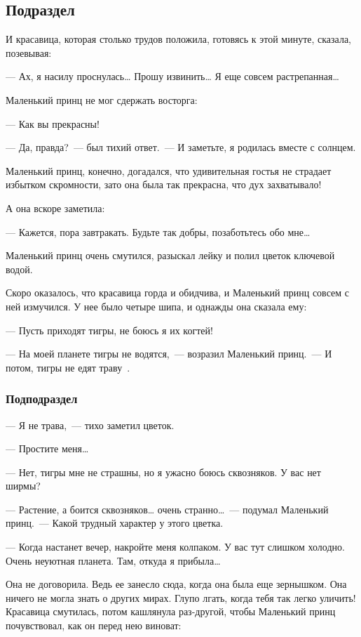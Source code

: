 \documentclass[14pt, a4paper, titlepage]{extarticle}
\begin{document}
\subsection{Подраздел}

И красавица, которая столько трудов положила, готовясь к этой минуте, сказала, позевывая:

--- Ах, я насилу проснулась\dots{} Прошу извинить\dots{} Я еще совсем растрепанная\dots{}

Маленький принц не мог сдержать восторга:

--- Как вы прекрасны!

--- Да, правда?~--- был тихий ответ.~--- И заметьте, я родилась вместе с солнцем.

Маленький принц, конечно, догадался, что удивительная гостья не страдает избытком скромности, зато она была так прекрасна, что дух захватывало!

А она вскоре заметила:

--- Кажется, пора завтракать. Будьте так добры, позаботьтесь обо мне\dots{}

Маленький принц очень смутился, разыскал лейку и полил цветок ключевой водой.

Скоро оказалось, что красавица горда и обидчива, и Маленький принц совсем с ней измучился. У нее было четыре шипа, и однажды она сказала ему:

--- Пусть приходят тигры, не боюсь я их когтей!

--- На моей планете тигры не водятся,~--- возразил Маленький принц.~--- И потом, тигры не едят траву~\cite{bib:prince}.

\subsubsection{Подподраздел}

--- Я не трава,~--- тихо заметил цветок.

--- Простите меня\dots{}

--- Нет, тигры мне не страшны, но я ужасно боюсь сквозняков. У вас нет ширмы?

--- Растение, а боится сквозняков\dots{} очень странно\dots{}~--- подумал Маленький принц.~--- Какой трудный характер у этого цветка.

--- Когда настанет вечер, накройте меня колпаком. У вас тут слишком холодно. Очень неуютная планета. Там, откуда я прибыла\dots{}

Она не договорила. Ведь ее занесло сюда, когда она была еще зернышком. Она ничего не могла знать о других мирах. Глупо лгать, когда тебя так легко уличить! Красавица смутилась, потом кашлянула раз-другой, чтобы Маленький принц почувствовал, как он перед нею виноват:
\end{document}

